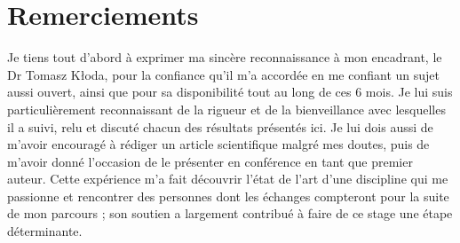 \documentclass[11pt,a4paper]{report}
\newcommand{\margehauttdm}{-1.5cm}
\newcommand{\espaceapreschapitre}{0.5cm}
\let\origtableofcontents\tableofcontents
\renewcommand{\tableofcontents}{%
  \begingroup
  \titlespacing*{\chapter}{0pt}{\margehauttdm}{\espaceapreschapitre}%
  \origtableofcontents
  \endgroup
}
\begin{document}
\pagestyle{empty}
\makeatletter
\let\psplainsauve\ps@plain
\let\ps@plain\ps@empty
\makeatother

\thispagestyle{empty}
\null\vspace*{\dimexpr0.764\textheight-1.5cm\relax}
\noindent\hspace*{\dimexpr0.25\textwidth-2cm\relax}{\itshape À mes parents\dots}
\newpage

\chapter*{Remerciements}
\thispagestyle{empty}

Je tiens tout d'abord à exprimer ma sincère reconnaissance à mon encadrant, le Dr Tomasz Kłoda, pour la confiance qu'il m'a accordée en me confiant un sujet aussi ouvert, ainsi que pour sa disponibilité tout au long de ces 6 mois. Je lui suis particulièrement reconnaissant de la rigueur et de la bienveillance avec lesquelles il a suivi, relu et discuté chacun des résultats présentés ici. Je lui dois aussi de m'avoir encouragé à rédiger un article scientifique malgré mes doutes, puis de m'avoir donné l'occasion de le présenter en conférence en tant que premier auteur. Cette expérience m'a fait découvrir l'état de l'art d'une discipline qui me passionne et rencontrer des personnes dont les échanges compteront pour la suite de mon parcours ; son soutien a largement contribué à faire de ce stage une étape déterminante.
\end{document}
